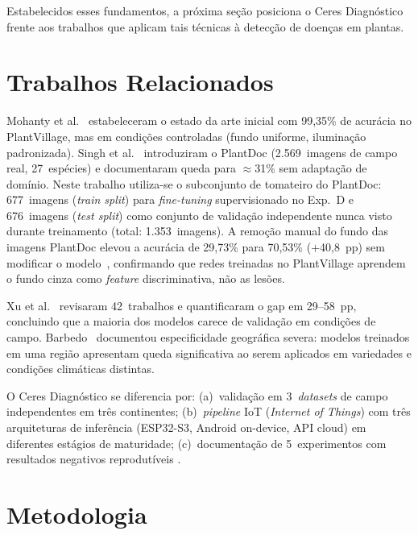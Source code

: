 \documentclass[12pt]{article}
\begin{document}
Estabelecidos esses fundamentos, a próxima seção posiciona o Ceres Diagnóstico
frente aos trabalhos que aplicam tais técnicas à detecção de doenças em plantas.


\section{Trabalhos Relacionados}
\label{sec:relacionados}

Mohanty et al.~\cite{mohanty2016} estabeleceram o estado da arte inicial com 99,35\%
de acurácia no PlantVillage, mas em condições controladas (fundo uniforme,
iluminação padronizada). Singh et al.~\cite{singh2020} introduziram o PlantDoc
(2.569~imagens de campo real, 27~espécies) e documentaram queda para
$\approx$31\% sem adaptação de domínio. Neste trabalho utiliza-se o subconjunto de
tomateiro do PlantDoc: 677~imagens (\textit{train split}) para \textit{fine-tuning}
supervisionado no Exp.~D e 676~imagens (\textit{test split}) como conjunto de
validação independente nunca visto durante treinamento (total: 1.353~imagens). A remoção manual do fundo
das imagens PlantDoc elevou a acurácia de 29,73\% para 70,53\% ($+$40,8~pp) sem
modificar o modelo~\cite{singh2020}, confirmando que redes treinadas no PlantVillage
aprendem o fundo cinza como \textit{feature} discriminativa, não as lesões.

Xu et al.~\cite{xu2024} revisaram 42~trabalhos e quantificaram o gap em 29--58~pp,
concluindo que a maioria dos modelos carece de validação em condições de campo.
Barbedo~\cite{barbedo2019} documentou especificidade geográfica severa: modelos
treinados em uma região apresentam queda significativa ao serem aplicados em
variedades e condições climáticas distintas.

O Ceres Diagnóstico se diferencia por: (a)~validação em 3~\textit{datasets} de campo
independentes em três continentes; (b)~\textit{pipeline} IoT (\textit{Internet of
Things}) com três arquiteturas de inferência (ESP32-S3, Android on-device,
API cloud) em diferentes estágios de maturidade; (c)~documentação de
5~experimentos com resultados negativos reprodutíveis \cite{pineau2021}.


\section{Metodologia}
\end{document}
